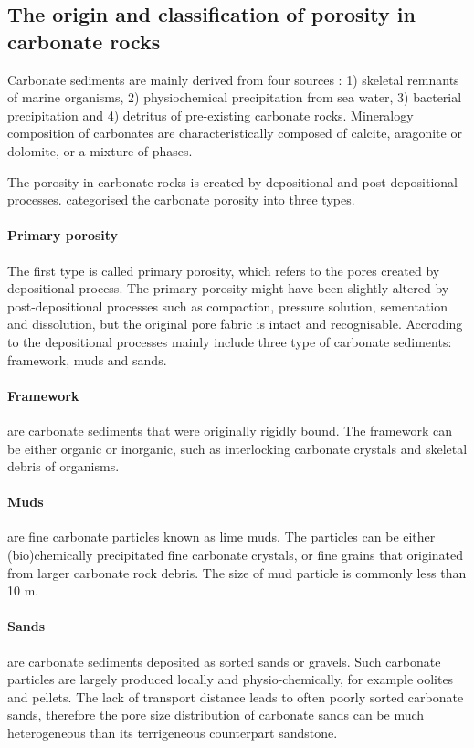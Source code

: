 \subsection{The origin and classification of porosity in carbonate rocks}
Carbonate sediments are mainly derived from four sources \citep{stehli1961mineralogy}: 1) skeletal remnants of marine organisms, 2) physiochemical precipitation from sea water, 3) bacterial precipitation and 4) detritus of pre-existing carbonate rocks. Mineralogy composition of carbonates are characteristically composed of calcite, aragonite or dolomite, or a mixture of phases. 

The porosity in carbonate rocks is created by depositional and post-depositional processes. \citet{murray1960origin} categorised the carbonate porosity into three types. 

\paragraph{Primary porosity} 
The first type is called primary porosity, which refers to the pores created by depositional process. The primary porosity might have been slightly altered by post-depositional processes such as compaction, pressure solution, sementation and dissolution, but the original pore fabric is intact and recognisable. Accroding to \citet{murray1960origin} the depositional processes mainly include three type of carbonate sediments: framework, muds and sands. 

\paragraph{Framework} are carbonate sediments that were originally rigidly bound. The framework can be either organic or inorganic, such as interlocking carbonate crystals and skeletal debris of organisms. 

\paragraph{Muds} are fine carbonate particles known as lime muds. The particles can be either (bio)chemically precipitated fine carbonate crystals, or fine grains that originated from larger carbonate rock debris. The size of mud particle is commonly less than 10 \textmu m.

\paragraph{Sands} are carbonate sediments deposited as sorted sands or gravels. Such carbonate particles are largely produced locally and physio-chemically, for example oolites and pellets. The lack of transport distance leads to often poorly sorted carbonate sands, therefore the pore size distribution of carbonate sands can be much heterogeneous than its terrigeneous counterpart sandstone.

